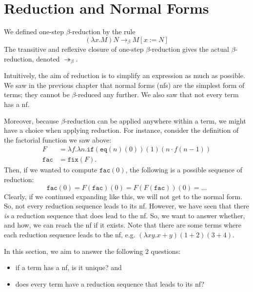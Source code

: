 \documentclass[a4paper, openany]{memoir}
\theoremstyle{definition}
\begin{document}
    \section{Reduction and Normal Forms}
    We defined one-step $\beta$-reduction by the rule
    \[(\lambda x.M) N \to_\beta M[x := N]\]
    The transitive and reflexive closure of one-step $\beta$-reduction gives the actual $\beta$-reduction, denoted $\twoheadrightarrow_\beta$. 

    Intuitively, the aim of reduction is to simplify an expression as much as possible. We saw in the previous chapter that normal forms (nfs) are the simplest form of terms; they cannot be $\beta$-reduced any further. We also saw that not every term has a nf.

    Moreover, because $\beta$-reduction can be applied anywhere within a term, we might have a choice when applying reduction. For instance, consider the definition of the factorial function we saw above:
    \begin{align*}
        F &= \lambda f.\lambda n.\texttt{if}(\texttt{eq}(n)(0))(1)(n \cdot f(n-1)) \\
        \texttt{fac} &= \texttt{fix}(F).
    \end{align*}
    Then, if we wanted to compute $\texttt{fac}(0)$, the following is a possible sequence of reduction:
    \[\texttt{fac}(0) = F(\texttt{fac})(0) = F(F(\texttt{fac}))(0) = \dots \]
    Clearly, if we continued expanding like this, we will not get to the normal form. So, not every reduction sequence leads to its nf. However, we have seen that there \textit{is} a reduction sequence that does lead to the nf. So, we want to answer whether, and how, we can reach the nf if it exists. Note that there are some terms where each reduction sequence leads to the nf, e.g. $(\lambda xy. x + y)(1 + 2)(3 + 4)$.

    In this section, we aim to answer the following 2 questions:
    \begin{itemize}
        \item if a term has a nf, is it unique? and
        \item does every term have a reduction sequence that leads to its nf?
    \end{itemize}
    
\end{document}
